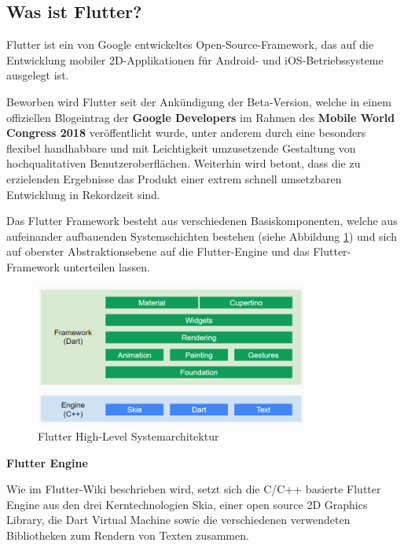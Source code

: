 \documentclass[bibliography=totoc,listof=totoc,BCOR=5mm,DIV=12,oneside]{scrbook}
\begin{document}
\subsection{Was ist Flutter?} 
\par Flutter ist ein von Google entwickeltes Open-Source-Framework, das auf die Entwicklung mobiler 2D-Applikationen für Android- und iOS-Betriebssysteme ausgelegt ist. 
\par \bigskip Beworben wird Flutter seit der Ankündigung der Beta-Version, welche in einem offiziellen Blogeintrag der \textbf{Google Developers}\citep{AnouncingFlutterBeta} im Rahmen des \textbf{Mobile World Congress 2018}\citep{MobileWordCongress} veröffentlicht wurde, unter anderem durch eine besonders flexibel handhabbare und mit Leichtigkeit umzusetzende Gestaltung von hochqualitativen Benutzeroberflächen. Weiterhin wird betont, dass die zu erzielenden Ergebnisse das Produkt einer extrem schnell umsetzbaren Entwicklung \grqq in Rekordzeit\grqq{} sind.

\par \bigskip Das Flutter Framework besteht aus verschiedenen Basiskomponenten, welche aus aufeinander aufbauenden Systemschichten bestehen (siehe Abbildung \ref{img:flutterHighLevelSystemOverview}) und sich auf oberster Abstraktionsebene auf die Flutter-Engine und das Flutter-Framework unterteilen lassen.

\bigskip
\begin{figure}[H]
	\centering
	\includegraphics[width=0.8\textwidth, keepaspectratio]{Bilder/highLevelOverview.png}
	\caption{Flutter High-Level Systemarchitektur \cite{Flu5}}
	\label{img:flutterHighLevelSystemOverview}
\end{figure}

\newpage

\par \bigskip \textbf{Flutter Engine}
\par Wie im Flutter-Wiki \citep{Flu4} beschrieben wird, setzt sich die C/C++ basierte Flutter Engine aus den drei Kerntechnologien Skia\citep{Skia1}, einer \grqq open source 2D Graphics Library\grqq, die Dart Virtual Machine sowie die verschiedenen verwendeten Bibliotheken zum Rendern von Texten zusammen.
\end{document}
